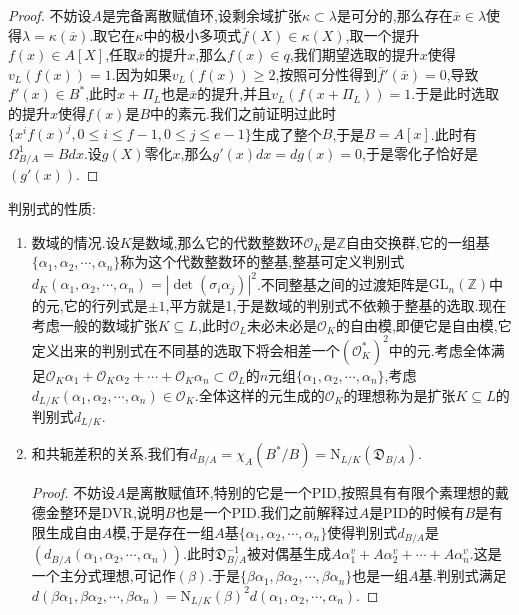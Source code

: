\begin{enumerate}
\begin{proof}
    	不妨设$A$是完备离散赋值环,设剩余域扩张$\kappa\subset\lambda$是可分的,那么存在$\overline{x}\in\lambda$使得$\lambda=\kappa(\overline{x})$.取它在$\kappa$中的极小多项式$\overline{f}(X)\in\kappa(X)$,取一个提升$f(x)\in A[X]$,任取$\overline{x}$的提升$x$,那么$f(x)\in q$,我们期望选取的提升$x$使得$v_L(f(x))=1$.因为如果$v_L(f(x))\ge2$,按照可分性得到$\overline{f}'(\overline{x})=0$,导致$f'(x)\in B^*$,此时$x+\Pi_L$也是$\overline{x}$的提升,并且$v_L(f(x+\Pi_L))=1$.于是此时选取的提升$x$使得$f(x)$是$B$中的素元.我们之前证明过此时$\{x^if(x)^j,0\le i\le f-1,0\le j\le e-1\}$生成了整个$B$,于是$B=A[x]$.此时有$\Omega^1_{B/A}=Bdx$.设$g(X)$零化$x$,那么$g'(x)dx=dg(x)=0$,于是零化子恰好是$(g'(x))$.
    \end{proof}
\end{enumerate}

判别式的性质:
\begin{enumerate}
	\item 数域的情况.设$K$是数域,那么它的代数整数环$\mathscr{O}_K$是$\mathbb{Z}$自由交换群,它的一组基$\{\alpha_1,\alpha_2,\cdots,\alpha_n\}$称为这个代数整数环的整基,整基可定义判别式$d_K(\alpha_1,\alpha_2,\cdots,\alpha_n)=\left|\det(\sigma_i\alpha_j)\right|^2$.不同整基之间的过渡矩阵是$\mathrm{GL}_n(\mathbb{Z})$中的元,它的行列式是$\pm1$,平方就是1,于是数域的判别式不依赖于整基的选取.现在考虑一般的数域扩张$K\subseteq L$,此时$\mathscr{O}_L$未必未必是$\mathscr{O}_K$的自由模,即便它是自由模,它定义出来的判别式在不同基的选取下将会相差一个$(\mathscr{O}_K^*)^2$中的元.考虑全体满足$\mathscr{O}_K\alpha_1+\mathscr{O}_K\alpha_2+\cdots+\mathscr{O}_K\alpha_n\subset\mathscr{O}_L$的$n$元组$\{\alpha_1,\alpha_2,\cdots,\alpha_n\}$,考虑$d_{L/K}(\alpha_1,\alpha_2,\cdots,\alpha_n)\in\mathscr{O}_K$.全体这样的元生成的$\mathscr{O}_K$的理想称为是扩张$K\subseteq L$的判别式$d_{L/K}$.
	\item 和共轭差积的关系.我们有$d_{B/A}=\chi_A(B^*/B)=\mathrm{N}_{L/K}(\mathfrak{D}_{B/A})$.
	\begin{proof}
		
		不妨设$A$是离散赋值环,特别的它是一个PID,按照具有有限个素理想的戴德金整环是DVR,说明$B$也是一个PID.我们之前解释过$A$是PID的时候有$B$是有限生成自由$A$模,于是存在一组$A$基$\{\alpha_1,\alpha_2,\cdots,\alpha_n\}$使得判别式$d_{B/A}$是$(d_{B/A}(\alpha_1,\alpha_2,\cdots,\alpha_n))$.此时$\mathfrak{D}^{-1}_{B/A}$被对偶基生成$A\alpha_1^{v}+A\alpha_2^v+\cdots+A\alpha_n^v$.这是一个主分式理想,可记作$(\beta)$.于是$\{\beta\alpha_1,\beta\alpha_2,\cdots,\beta\alpha_n\}$也是一组$A$基.判别式满足$d(\beta\alpha_1,\beta\alpha_2,\cdots,\beta\alpha_n)=\mathrm{N}_{L/K}(\beta)^2d(\alpha_1,\alpha_2,\cdots,\alpha_n)$.
		

\end{proof}
\end{enumerate}
